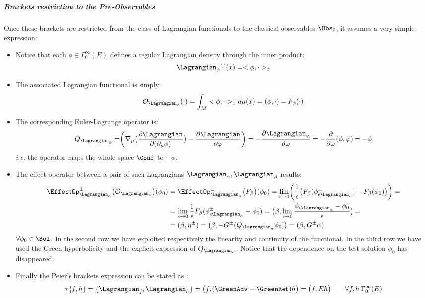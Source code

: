 \documentclass[Main]{subfiles}
\begin{document}
			\subparagraph{Brackets restriction to the Pre-Observables}
				Once these brackets are restricted from the class of Lagrangian functionals to the classical observables $\Obs_0$, it assumes a very simple expression:
				\begin{itemize}
					\item Notice that each $\phi \in \Gamma_0^\infty(E)$ defines a regular Lagrangian density through the inner product:
						\begin{displaymath}
							\Lagrangian_\phi[\cdot](x) = <\phi, \cdot>_x
						\end{displaymath}
					\item The associated Lagrangian functional is simply:
						\begin{displaymath}
							\mathcal{O}_{\Lagrangian_\phi} (\cdot ) = \int_M  <\phi, \cdot>_x d\mu(x) = (\phi, \cdot) = F_\phi (\cdot)
						\end{displaymath}
					\item The corresponding Euler-Lagrange operator is:
						\begin{displaymath}
							Q_{\Lagrangian_\phi}= \biggr( \nabla_\mu \big( \frac{\partial \Lagrangian}{\partial ( \partial_\mu \phi)} \big) - \frac{\partial \Lagrangian}{\partial \varphi} \biggr) = - \frac{\partial \Lagrangian_\varphi}{\partial \varphi} = -\frac{\partial}{\partial \varphi} (\phi, \varphi) = -\phi
						\end{displaymath}
						\textit{i.e.} the operator maps the whole space $\Conf$ to $-\phi$.
					\item The effect operator between a pair of such Lagrangians $\Lagrangian_\alpha, \Lagrangian_\beta$ results:
						\begin{align}
						\EffectOp_{\Lagrangian_\alpha}^\pm \big( \mathcal{O}_{\Lagrangian_\beta} \big) (\phi_0) &= \EffectOp_{\Lagrangian_\alpha}^\pm \big( F_\beta  \big) (\phi_0) = \lim_{\epsilon \rightarrow 0} \biggr( \frac{1}{\epsilon}\big(F_\beta ( \phi_{\epsilon \Lagrangian_\alpha}^\pm) - F_\beta(\phi_0) \big) \biggr) =\\
							&= \lim_{\epsilon \rightarrow 0} \frac{1}{\epsilon}F_\beta( \phi_{\epsilon \Lagrangian_\alpha}^\pm - \phi_0) = 
							\big(\beta, \lim_{\epsilon\rightarrow 0} \frac{ \phi_{\epsilon \Lagrangian_\alpha}  - \phi_0}{\epsilon} \big) = \\
							&=(\beta, \eta^\pm) = \big( \beta, - G^\pm (Q_{\Lagrangian_\alpha} \phi_0 ) \big) = ( \beta, G^\pm \alpha)
						\end{align}
						 $\forall 	\phi_0\in \Sol$.
						 In the second row we have exploited respectively the linearity and continuity of the functional.
						 In the third row we have used the Green hyperbolicity and the explicit expression of $Q_{\Lagrangian_\alpha}$.
						 Notice that the dependence on the test solution $\phi_0$ has disappeared.
					\item Finally the Peierls brackets expression can be stated as :
						\begin{equation}\label{Def:SymplecticTau}
							\tau\{f,h\} = \{\Lagrangian_f , \Lagrangian_h\} = \big( f , (\GreenAdv - \GreenRet)h \big) = \big(f, E h\big) \qquad \forall f,h \: \Gamma_0^\infty (E)
						\end{equation}
				\end{itemize}
\end{document}
